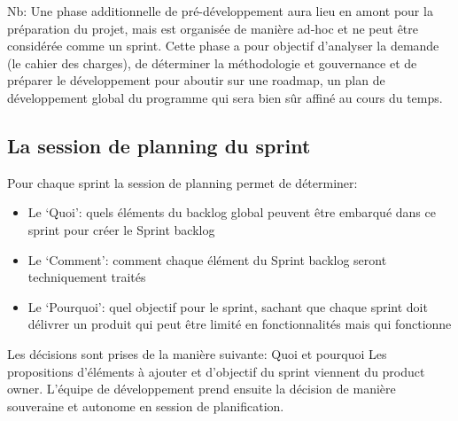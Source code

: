 Nb: Une phase additionnelle de pré-développement aura lieu en amont pour la préparation du projet, mais est organisée de manière ad-hoc et ne peut être considérée comme un sprint. Cette phase a pour objectif d’analyser la demande (le cahier des charges), de déterminer la méthodologie et gouvernance et de préparer le développement pour aboutir sur une roadmap, un plan de développement global du programme qui sera bien sûr affiné au cours du temps.

\subsection{La session de planning du sprint}

Pour chaque sprint la session de planning permet de déterminer:

\begin{itemize}
    \item Le ‘Quoi’: quels éléments du backlog global peuvent être embarqué dans ce sprint pour créer le Sprint backlog
    \item Le ‘Comment’: comment chaque élément du Sprint backlog seront techniquement traités
    \item Le ‘Pourquoi’: quel objectif pour le sprint, sachant que chaque sprint doit délivrer un produit qui peut être limité en fonctionnalités mais qui fonctionne
\end{itemize}

Les décisions sont prises de la manière suivante:
 Quoi et pourquoi
Les propositions d'éléments à ajouter et d’objectif du sprint viennent du product owner. L'équipe de développement prend ensuite la décision de manière souveraine et autonome en session de planification.
